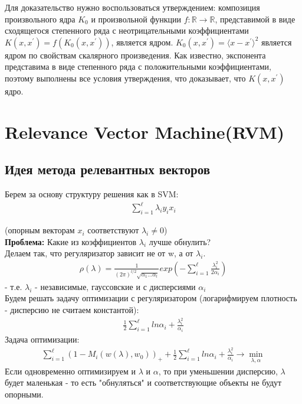 Для доказательство нужно воспользоваться утверждением: композиция произвольного ядра $K_0$ и произвольной функции
$f: \mathbb{R} \rightarrow \mathbb{R}$, представимой в виде сходящегося степенного ряда с неотрицательными коэффициентами
$K\left(x, x^{\prime}\right)=f\left(K_0\left(x, x^{\prime}\right)\right)$, является ядром.
$K_0(x, x^{\prime}) = \langle x - x^{\prime} \rangle^2$ является ядром по свойствам скалярного произведения. Как известно,
экспонента представима в виде степенного ряда с положительными коэффициентами, поэтому выполнены все условия утверждения, что
доказывает, что $K(x, x^{\prime})$ ядро.


\section{Relevance Vector Machine(RVM)}

\subsection{Идея метода релевантных векторов}

Берем за основу структуру решения как в SVM:\\
\begin{align*}
    \sum_{i=1}^{\ell} \lambda_i y_i x_i
\end{align*}

(опорным векторам $x_i$ соответствуют $\lambda_i \neq 0$) \\
\textbf{Проблема:} Какие из коэффициентов $\lambda_i$ лучше обнулить? \\
Делаем так, что регуляризатор зависит не от w, а от $\lambda_i$. \\
\begin{align*}
    \rho (\lambda) = \frac{1}{(2\pi)^{l/2} \sqrt{\alpha_1...\alpha_l}} exp(-\sum_{i=1}^{\ell} \frac{\lambda_i^2}{2\alpha_i})
\end{align*}
- т.е. $\lambda_i$ - независимые, гауссовские и с дисперсиями $\alpha_i$ \\
Будем решать задачу оптимизации с регуляризатором (логарифмируем плотность - дисперсию не считаем константой): \\
\begin{align*}
    \frac{1}{2} \sum_{i=1}^{\ell} ln\alpha_i + \frac{\lambda_i^2}{\alpha_i}
\end{align*}
Задача оптимизации:  \\
\begin{align*}
    \sum_{i=1}^{\ell} (1 - M_i(w(\lambda), w_0))_+ + \frac{1}{2} \sum_{i=1}^{\ell} ln\alpha_i + \frac{\lambda_i^2}{\alpha_i} \rightarrow \min_{\lambda, \alpha}
\end{align*}
Если одновременно оптимизируем и $\lambda$ и $\alpha$, то при уменьшении дисперсию, $\lambda$ будет маленькая - то есть "обнуляться" и соответствующие объекты не будут опорными.

